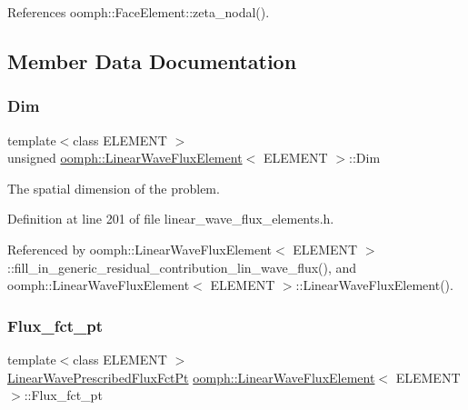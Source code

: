 References oomph\+::\+Face\+Element\+::zeta\+\_\+nodal().



\subsection{Member Data Documentation}
\mbox{\label{classoomph_1_1LinearWaveFluxElement_a7c846cb5877fbf923be7a42a5b24f926}} 
\subsubsection{\texorpdfstring{Dim}{Dim}}
{\footnotesize\ttfamily template$<$class E\+L\+E\+M\+E\+NT $>$ \\
unsigned \hyperlink{classoomph_1_1LinearWaveFluxElement}{oomph\+::\+Linear\+Wave\+Flux\+Element}$<$ E\+L\+E\+M\+E\+NT $>$\+::Dim\hspace{0.3cm}{\ttfamily [private]}}



The spatial dimension of the problem. 



Definition at line 201 of file linear\+\_\+wave\+\_\+flux\+\_\+elements.\+h.



Referenced by oomph\+::\+Linear\+Wave\+Flux\+Element$<$ E\+L\+E\+M\+E\+N\+T $>$\+::fill\+\_\+in\+\_\+generic\+\_\+residual\+\_\+contribution\+\_\+lin\+\_\+wave\+\_\+flux(), and oomph\+::\+Linear\+Wave\+Flux\+Element$<$ E\+L\+E\+M\+E\+N\+T $>$\+::\+Linear\+Wave\+Flux\+Element().

\mbox{\label{classoomph_1_1LinearWaveFluxElement_a91d78912959e683d299a6778590957d2}} 
\subsubsection{\texorpdfstring{Flux\+\_\+fct\+\_\+pt}{Flux\_fct\_pt}}
{\footnotesize\ttfamily template$<$class E\+L\+E\+M\+E\+NT $>$ \\
\hyperlink{classoomph_1_1LinearWaveFluxElement_a4010abac8856733ae2b152bc41e7b558}{Linear\+Wave\+Prescribed\+Flux\+Fct\+Pt} \hyperlink{classoomph_1_1LinearWaveFluxElement}{oomph\+::\+Linear\+Wave\+Flux\+Element}$<$ E\+L\+E\+M\+E\+NT $>$\+::Flux\+\_\+fct\+\_\+pt\hspace{0.3cm}{\ttfamily [private]}}



